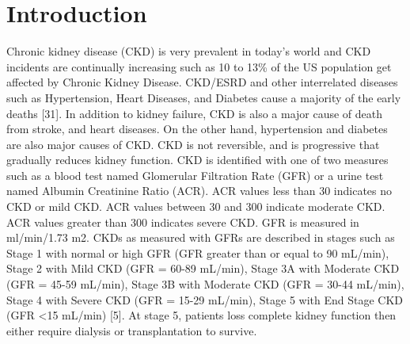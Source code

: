 \section{Introduction}
Chronic kidney disease (CKD) is very prevalent in today’s world and CKD incidents are continually increasing such as 10 to 13\% of the US population get affected by Chronic Kidney Disease. CKD/ESRD and other interrelated diseases such as Hypertension, Heart Diseases, and Diabetes cause a majority of the early deaths [31]. In addition to kidney failure, CKD is also a major cause of death from stroke, and heart diseases. On the other hand, hypertension and diabetes are also major causes of CKD. CKD is not reversible, and is progressive that gradually reduces kidney function. CKD is identified with one of two measures such as a blood test named Glomerular Filtration Rate (GFR) or a urine test named Albumin Creatinine Ratio (ACR).  ACR values less than 30 indicates no CKD or mild CKD. ACR values between 30 and 300 indicate moderate CKD. ACR values greater than 300 indicates severe CKD. GFR is measured in ml/min/1.73 m2. CKDs as measured with GFRs are described in stages such as Stage 1 with normal or high GFR (GFR greater than or equal to 90 mL/min), Stage 2 with Mild CKD (GFR = 60-89 mL/min), Stage 3A with Moderate CKD (GFR = 45-59 mL/min), Stage 3B with Moderate CKD (GFR = 30-44 mL/min), Stage 4 with Severe CKD (GFR = 15-29 mL/min), Stage 5 with End Stage CKD (GFR <15 mL/min) [5]. At stage 5, patients loss complete kidney function then either require dialysis or transplantation to survive.

\medskip

